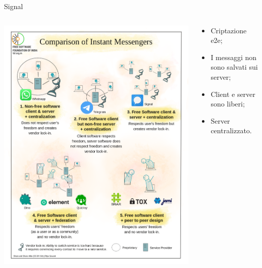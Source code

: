 \begin{myframe}{Signal}
  \begin{columns}
    \begin{column}{.5\textwidth}
      \includegraphics[width=.9\textwidth]{img/chat}
    \end{column}
    \begin{column}{.5\textwidth}
      \begin{itemize}[<+->]
        \item Criptazione e2e;
        \item I messaggi non sono salvati sui server;
        \item Client e server sono liberi;
        \item Server centralizzato.
      \end{itemize}
    \end{column}
  \end{columns}
\end{myframe}

